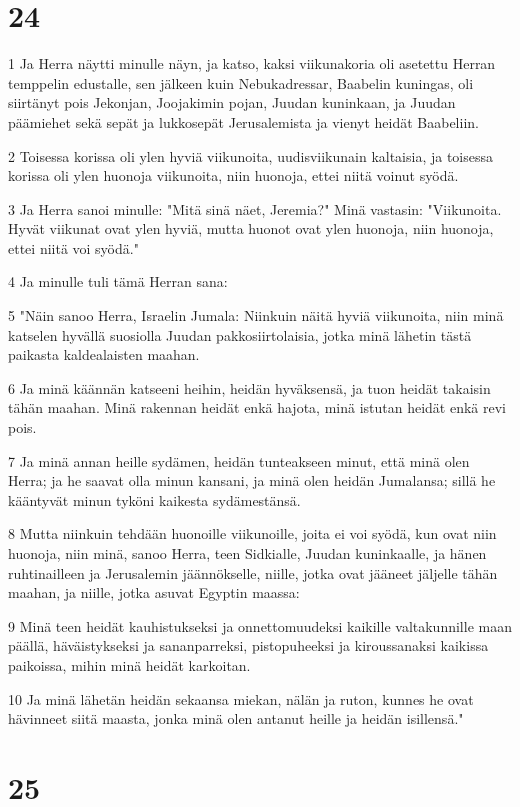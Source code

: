 \chapter{24}

\par 1 Ja Herra näytti minulle näyn, ja katso, kaksi viikunakoria oli asetettu Herran temppelin edustalle, sen jälkeen kuin Nebukadressar, Baabelin kuningas, oli siirtänyt pois Jekonjan, Joojakimin pojan, Juudan kuninkaan, ja Juudan päämiehet sekä sepät ja lukkosepät Jerusalemista ja vienyt heidät Baabeliin.
\par 2 Toisessa korissa oli ylen hyviä viikunoita, uudisviikunain kaltaisia, ja toisessa korissa oli ylen huonoja viikunoita, niin huonoja, ettei niitä voinut syödä.
\par 3 Ja Herra sanoi minulle: "Mitä sinä näet, Jeremia?" Minä vastasin: "Viikunoita. Hyvät viikunat ovat ylen hyviä, mutta huonot ovat ylen huonoja, niin huonoja, ettei niitä voi syödä."
\par 4 Ja minulle tuli tämä Herran sana:
\par 5 "Näin sanoo Herra, Israelin Jumala: Niinkuin näitä hyviä viikunoita, niin minä katselen hyvällä suosiolla Juudan pakkosiirtolaisia, jotka minä lähetin tästä paikasta kaldealaisten maahan.
\par 6 Ja minä käännän katseeni heihin, heidän hyväksensä, ja tuon heidät takaisin tähän maahan. Minä rakennan heidät enkä hajota, minä istutan heidät enkä revi pois.
\par 7 Ja minä annan heille sydämen, heidän tunteakseen minut, että minä olen Herra; ja he saavat olla minun kansani, ja minä olen heidän Jumalansa; sillä he kääntyvät minun tyköni kaikesta sydämestänsä.
\par 8 Mutta niinkuin tehdään huonoille viikunoille, joita ei voi syödä, kun ovat niin huonoja, niin minä, sanoo Herra, teen Sidkialle, Juudan kuninkaalle, ja hänen ruhtinailleen ja Jerusalemin jäännökselle, niille, jotka ovat jääneet jäljelle tähän maahan, ja niille, jotka asuvat Egyptin maassa:
\par 9 Minä teen heidät kauhistukseksi ja onnettomuudeksi kaikille valtakunnille maan päällä, häväistykseksi ja sananparreksi, pistopuheeksi ja kiroussanaksi kaikissa paikoissa, mihin minä heidät karkoitan.
\par 10 Ja minä lähetän heidän sekaansa miekan, nälän ja ruton, kunnes he ovat hävinneet siitä maasta, jonka minä olen antanut heille ja heidän isillensä."

\chapter{25}

